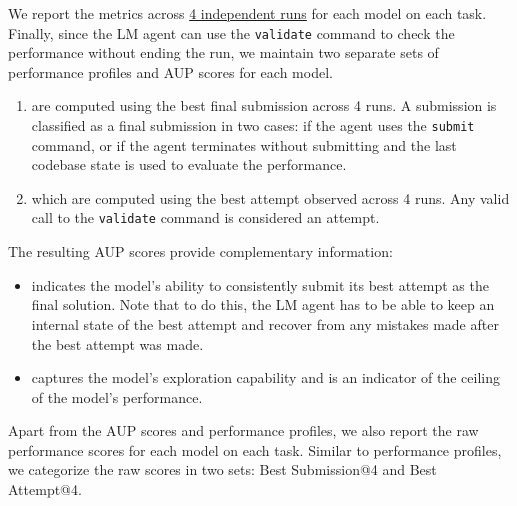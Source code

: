 We report the metrics across \ul{4 independent runs} for each model on each task.
%
Finally, since the LM agent can use the \texttt{validate} command to check the performance without ending the run, we maintain two separate sets of performance profiles and AUP scores for each model.
\begin{enumerate}
    \item {} are computed using the best final submission across 4 runs. A submission is classified as a final submission in two cases: if the agent uses the \texttt{submit} command, or if the agent terminates without submitting and the last codebase state is used to evaluate the performance.
    \item {} which are computed using the best attempt observed across 4 runs. Any valid call to the \texttt{validate} command is considered an attempt.
\end{enumerate}
%
%
%
The resulting AUP scores provide complementary information:
\begin{itemize}
    \item {} indicates the model's ability to consistently submit its best attempt as the final solution. Note that to do this, the LM agent has to be able to keep an internal state of the best attempt and recover from any mistakes made after the best attempt was made.
    \item {} captures the model's exploration capability and is an indicator of the ceiling of the model's performance.
\end{itemize}

Apart from the AUP scores and performance profiles, we also report the raw performance scores for each model on each task.
%
Similar to performance profiles, we categorize the raw scores in two sets: Best Submission@4 and Best Attempt@4.

